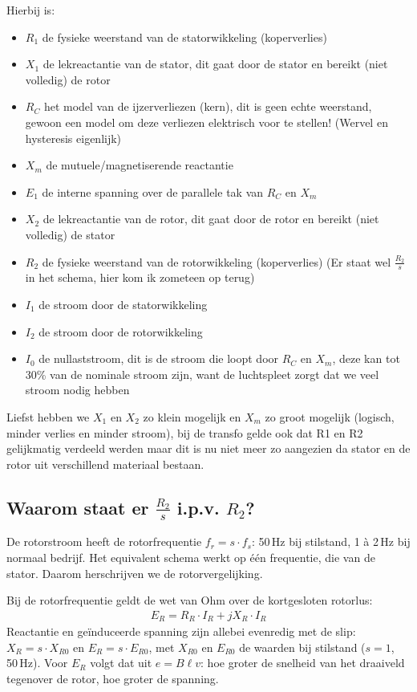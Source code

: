 Hierbij is:

\begin{itemize}
 \item \textbf{$R_1$} de fysieke weerstand van de statorwikkeling (koperverlies)
 \item \textbf{$X_1$} de lekreactantie van de stator, dit gaat door de stator en bereikt
 (niet volledig) de rotor
 \item \textbf{$R_C$} het model van de ijzerverliezen (kern), dit is geen echte weerstand,
 gewoon een model om deze verliezen elektrisch voor te stellen!
 (Wervel en hysteresis eigenlijk)
 \item \textbf{$X_m$} de mutuele/magnetiserende reactantie
 \item \textbf{$E_1$} de interne spanning over de parallele tak van $R_C$ en $X_m$
 \item \textbf{$X_2$} de lekreactantie van de rotor, dit gaat door de rotor en bereikt
 (niet volledig) de stator
 \item \textbf{$R_2$} de fysieke weerstand van de rotorwikkeling (koperverlies) (Er staat
 wel $\frac{R_2}{s}$ in het schema, hier kom ik zometeen op terug)
 \item \textbf{$I_1$} de stroom door de statorwikkeling
 \item \textbf{$I_2$} de stroom door de rotorwikkeling
 \item \textbf{$I_0$} de nullaststroom, dit is de stroom die loopt door $R_C$ en $X_m$,
 deze kan tot 30\% van de nominale stroom zijn, want de luchtspleet zorgt dat we veel
 stroom nodig hebben
\end{itemize}

Liefst hebben we $X_1$ en $X_2$ zo klein mogelijk en $X_m$ zo groot mogelijk (logisch,
minder verlies en minder stroom), bij de transfo gelde ook dat R1 en R2 gelijkmatig
verdeeld werden maar dit is nu niet meer zo aangezien da stator en de rotor uit
verschillend materiaal bestaan.

\subsection{Waarom staat er $\frac{R_2}{s}$ i.p.v. $R_2$?}
De rotorstroom heeft de rotorfrequentie $f_r = s \cdot f_s$: 50\,Hz bij stilstand, 1 à 2\,Hz
bij normaal bedrijf. Het equivalent schema werkt op één frequentie, die van de stator. Daarom
herschrijven we de rotorvergelijking.

Bij de rotorfrequentie geldt de wet van Ohm over de kortgesloten rotorlus:
\begin{align*}
    E_R = R_R \cdot I_R + jX_R \cdot I_R
\end{align*}
Reactantie en geïnduceerde spanning zijn allebei evenredig met de slip:
$X_R = s \cdot X_{R0}$ en $E_R = s \cdot E_{R0}$, met $X_{R0}$ en $E_{R0}$ de waarden bij
stilstand ($s = 1$, 50\,Hz). Voor $E_R$ volgt dat uit $e = B\ell v$: hoe groter de
snelheid van het draaiveld tegenover de rotor, hoe groter de spanning.

